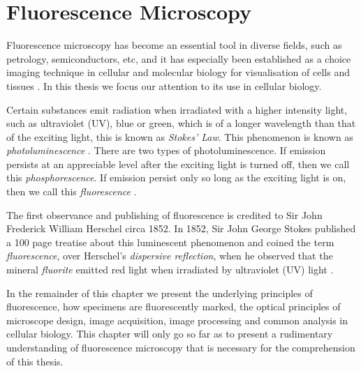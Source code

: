 
\chapter{Fluorescence Microscopy} %

\label{chap:Chapter2} %

Fluorescence microscopy has become an essential tool in diverse fields, such as petrology, semiconductors, etc, and it has especially been established as a choice imaging technique in cellular and molecular biology for visualisation of cells and tissues \citep{Spring2003,Danek2012,Hubeny2008,Fatima2008,Matula2012}.
In this thesis we focus our attention to its use in cellular biology.

Certain substances emit radiation when irradiated with a higher intensity light, such as ultraviolet (UV), blue or green, which is of a longer wavelength than that of the exciting light, this is known as \textit{Stokes' Law}.
This phenomenon is known as \textit{photoluminescence} \citep{Koch1972,Vaughan2015,Sarder2006,AbramowitzDavidson2016}.
There are two types of photoluminescence. If emission persists at an appreciable level after the exciting light is turned off, then we call this \textit{phosphorescence}.
If emission persist only so long as the exciting light is on, then we call this \textit{fluorescence} \citep{Koch1972,SpringDavisdson2016}.

The first observance and publishing of fluorescence is credited to Sir John Frederick William Herschel circa 1852.
In 1852, Sir John George Stokes published a 100 page treatise about this luminescent phenomenon and coined the term \textit{fluorescence}, over Herschel's \textit{dispersive reflection}, when he observed that the mineral \textit{fluorite} emitted red light when irradiated by ultraviolet (UV) light \citep{Dobrucki2013,Danek2012}.

In the remainder of this chapter we present the underlying principles of fluorescence, how specimens are fluorescently marked, the optical principles of microscope design, image acquisition, image processing and common analysis in cellular biology.
This chapter will only go so far as to present a rudimentary understanding of fluorescence microscopy that is necessary for the comprehension of this thesis.


